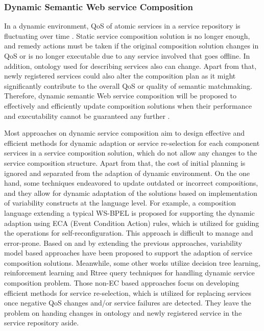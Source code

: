 \subsubsection{Dynamic Semantic Web service Composition}
In a dynamic environment, QoS of atomic services in a service repository is fluctuating over time \cite{wen2014probabilistic}. Static service composition solution is no longer enough, and remedy actions must be taken if the original composition solution changes in QoS or is no longer executable due to any service involved that goes offline. In addition, ontology used for describing services also can change. Apart from that, newly registered services could also alter the composition plan as it might significantly contribute to the overall QoS or quality of semantic matchmaking. Therefore, dynamic semantic Web service composition will be proposed to effectively and efficiently update composition solutions when their performance and executability cannot be guaranteed any further \cite{li2014fault}. 


Most approaches on dynamic service composition aim to design effective and efficient methods for dynamic adaption or service re-selection for each component services in a service composition solution, which do not allow any changes to the service composition structure. Apart from that, the cost of initial planning is ignored and separated from the adaption of dynamic environment. On the one hand, some techniques \cite{andrews2003business,baresi2011self,koning2009vxbpel} endeavored to update outdated or incorrect compositions, and they allow for dynamic adaptation of the solutions based on implementation of variability constructs at the language level. For example, a composition language extending a typical WS-BPEL \cite{andrews2003business} is proposed for supporting the dynamic adaption using ECA (Event Condition Action) rules, which is utilized for guiding the operations for self-reconfiguration. This approach is difficult to manage and error-prone. Based on and by extending the previous approaches, variability model based approaches \cite{alferez2014dynamic} have been proposed to support the adaption of service composition solutions. Meanwhile, some other works \cite{mohanty2010web,salas2006ws,wagner2016robust,yin2010qos} utilize decision tree learning, reinforcement learning and Rtree query techniques for handling dynamic service composition problem. Those non-EC based approaches focus on developing efficient methods for service re-selection, which is utilized for replacing services once negative QoS changes and/or service failures are detected. They leave the problem on handing changes in ontology and newly registered service in the service repository aside.

